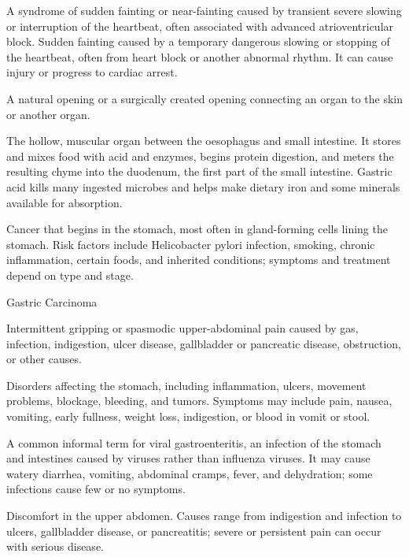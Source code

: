  A syndrome of sudden fainting or near-fainting caused by transient severe slowing or interruption of the heartbeat, often associated with advanced atrioventricular block.
 Sudden fainting caused by a temporary dangerous slowing or stopping of the heartbeat, often from heart block or another abnormal rhythm. It can cause injury or progress to cardiac arrest.

 A natural opening or a surgically created opening connecting an organ to the skin or another organ.

 The hollow, muscular organ between the oesophagus and small intestine. It stores and mixes food with acid and enzymes, begins protein digestion, and meters the resulting chyme into the duodenum, the first part of the small intestine. Gastric acid kills many ingested microbes and helps make dietary iron and some minerals available for absorption.

 Cancer that begins in the stomach, most often in gland-forming cells lining the stomach. Risk factors include Helicobacter pylori infection, smoking, chronic inflammation, certain foods, and inherited conditions; symptoms and treatment depend on type and stage.

\synonyms
Gastric Carcinoma

 Intermittent gripping or spasmodic upper-abdominal pain caused by gas, infection, indigestion, ulcer disease, gallbladder or pancreatic disease, obstruction, or other causes.

 Disorders affecting the stomach, including inflammation, ulcers, movement problems, blockage, bleeding, and tumors. Symptoms may include pain, nausea, vomiting, early fullness, weight loss, indigestion, or blood in vomit or stool.

 A common informal term for viral gastroenteritis, an infection of the stomach and intestines caused by viruses rather than influenza viruses. It may cause watery diarrhea, vomiting, abdominal cramps, fever, and dehydration; some infections cause few or no symptoms.

 Discomfort in the upper abdomen. Causes range from indigestion and infection to ulcers, gallbladder disease, or pancreatitis; severe or persistent pain can occur with serious disease.

